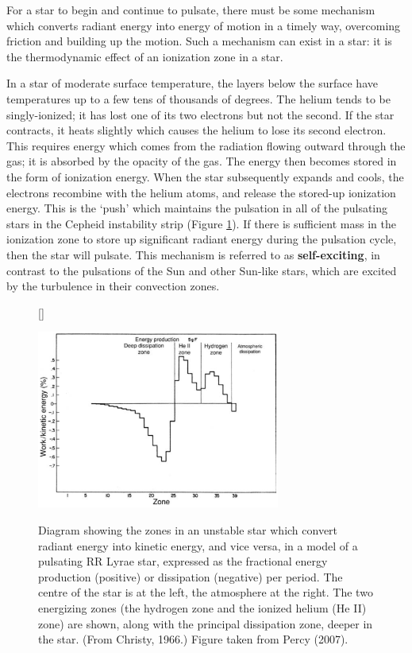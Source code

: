 \documentclass[a4paper,10pt]{article}
\begin{document}
{\noindent}For a star to begin and continue to pulsate, there must be some mechanism which converts radiant energy into energy of motion in a timely way, overcoming friction and building up the motion. Such a mechanism can exist in a star: it is the thermodynamic effect of an ionization zone in a star.

{\noindent}In a star of moderate surface temperature, the layers below the surface have temperatures up to a few tens of thousands of degrees. The helium tends to be singly-ionized; it has lost one of its two electrons but not the second. If the star contracts, it heats slightly which causes the helium to lose its second electron. This requires energy which comes from the radiation flowing outward through the gas; it is absorbed by the opacity of the gas. The energy then becomes stored in the form of ionization energy. When the star subsequently expands and cools, the electrons recombine with the helium atoms, and release the stored-up ionization energy. This is the `push' which maintains the pulsation in all of the pulsating stars in the Cepheid instability strip (Figure \ref{fig:variablezones}). If there is sufficient mass in the ionization zone to store up significant radiant energy during the pulsation cycle, then the star will pulsate. This mechanism is referred to as \textbf{self-exciting}, in contrast to the pulsations of the Sun and other Sun-like stars, which are excited by the turbulence in their convection zones.

\begin{figure}[h]
    [\FBwidth]
    {\caption{\footnotesize{Diagram showing the zones in an unstable star which convert radiant energy into kinetic energy, and vice versa, in a model of a pulsating RR Lyrae star, expressed as the fractional energy production (positive) or dissipation (negative) per period. The centre of the star is at the left, the atmosphere at the right. The two energizing zones (the hydrogen zone and the ionized helium (He II) zone) are shown, along with the principal dissipation zone, deeper in the star. (From Christy, 1966.) Figure taken from Percy (2007).}}
    \label{fig:variablezones}}
    {\includegraphics[width=8cm]{figures/VariableZones.png}}
\end{figure}
\end{document}
